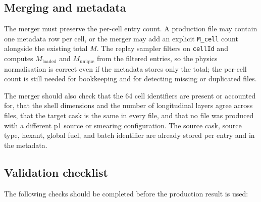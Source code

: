 \documentclass[11pt,a4paper]{article}
\begin{document}
\subsection{Merging and metadata}

The merger must preserve the per-cell entry count. A production file may
contain one metadata row per cell, or the merger may add an explicit
\texttt{M\_cell} count alongside the existing total $M$. The replay sampler
filters on \texttt{cellId} and computes $M_{\mathrm{loaded}}$ and
$M_{\mathrm{unique}}$ from the filtered entries, so the physics normalisation is
correct even if the metadata stores only the total; the per-cell count is still
needed for bookkeeping and for detecting missing or duplicated files.

The merger should also check that the 64 cell identifiers are present or
accounted for, that the shell dimensions and the number of longitudinal layers
agree across files, that the target cask is the same in every file, and that no
file was produced with a different p1 source or smearing configuration. The
source cask, source type, hexant, global fuel, and batch identifier are already
stored per entry and in the metadata.

\subsection{Validation checklist}

The following checks should be completed before the production result is used:
\end{document}
